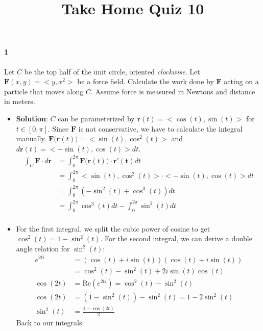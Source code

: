 \documentclass{article}
\title{Take Home Quiz 10}
\author{}
\date{}
\begin{document}
    \maketitle

    \paragraph{1} Let $C$ be the top half of the unit circle, oriented \textit{clockwise}.
    Let $\mathbf{F}(x,y)=<y,x^2>$ be a force field.
    Calculate the work done by $\mathbf{F}$ acting on a particle that moves along $C$.
    Assume force is measured in Newtons and distance in meters.
    \\
    \begin{itemize}
        \item \textbf{Solution}: $C$ can be parameterized by $\mathbf{r}(t)=<\cos(t), \sin(t)>$ for $t \in [0,\pi]$.
        Since $\mathbf{F}$ is not conservative, we have to calculate the integral manually.
        $\mathbf{F(r}(t)) = <\sin(t), \cos^2(t)>$ and $d\mathbf{r}(t)=<-\sin(t), \cos(t)>dt$.
        \begin{align*}
            \int_C \mathbf{F\cdot }d\mathbf{r} &= \int_0^{2\pi} \mathbf{F(r}(t)) \cdot \mathbf{r'(t)}dt \\
            &= \int_0^{2\pi} <\sin(t), \cos^{2}(t)> \cdot <-\sin(t), \cos(t)>dt \\
            &= \int_0^{2\pi} (-\sin^{2}(t) + \cos^{3}(t))dt \\
            &= \int_0^{2\pi} \cos^{3}(t)dt - \int_0^{2\pi} \sin^{2}(t)dt \\
        \end{align*}
        \item For the first integral, we split the cubic power of cosine to get $\cos^{2}(t)=1-\sin^{2}(t)$.
        For the second integral, we can derive a double angle relation for $\sin^{2}(t)$:
        \begin{align*}
            e^{2ti} &= (\cos(t) + i\sin(t))(\cos(t) + i\sin(t)) \\
            &= \cos^{2}(t) - \sin^2(t) + 2i\sin(t)\cos(t) \\
            \cos(2t) &= \mathrm{Re}(e^{2ti}) = \cos^2(t)-\sin^2(t)\\
            \cos(2t) &= (1-\sin^{2}(t))-\sin^{2}(t) = 1-2\sin^{2}(t)\\
            \sin^2(t) &= \frac{1-\cos(2t)}{2}
        \end{align*}
        Back to our integrals:

\end{itemize}
\end{document}
